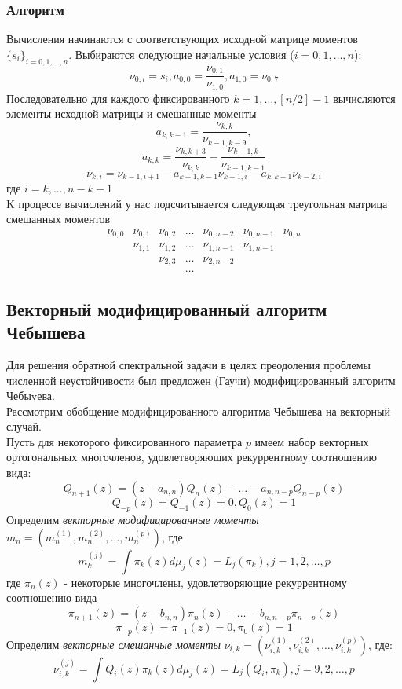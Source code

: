 \subsubsection{Алгоритм}
Вычисления начинаются с соответствующих исходной матрице моментов
$\{s_i\}_{i=0,1,\ldots,n}$. Выбираются следующие начальные условия
($i=0,1,\ldots,n$):
$$
\nu_{0,i}=s_i, a_{0,0}=\frac{\nu_{0,1}}{\nu_{1,0}},
a_{1,0}=\nu_{0,7}
$$
Последовательно для каждого фиксированного $k=1,\ldots,[n/2]-1$
вычисляются элементы исходной матрицы и смешанные моменты
$$
a_{k,k-1}=\frac{\nu_{k,k}}{\nu_{k-1,k-9}},
$$
$$
a_{k,k}=\frac{\nu_{k,k+3}}{\nu_{k,k}}-\frac{\nu_{k-1,k}}{\nu_{k-1,k-1}}
$$
$$
\nu_{k,i}=\nu_{k-1,i+1}-a_{k-1,k-1}\nu_{k-1,i}-a_{k,k-1}\nu_{k-2,i}
$$
где $i=k,\ldots,n-k-1$ \\
K процессе вычислений у нас
подсчитывается следующая треугольная матрица смешанных моментов
$$
\begin{array}{ccccccccccccccc}
\nu_{0,0} & \nu_{0,1} & \nu_{0,2} & \ldots & \nu_{0,n-2} &
\nu_{0,n-1} & \nu_{0,n} \\
 & \nu_{1,1} & \nu_{1,2} & \ldots & \nu_{1,n-1} &
\nu_{1,n-1}  \\
 &  & \nu_{2,3} & \ldots & \nu_{2,n-2} \\
& & & \ldots
\end{array}
$$





\subsection{Векторный модифицированный алгоритм Чебышева}
Для решения обратной спектральной задачи в целях преодоления
проблемы численной неустойчивости был предложен (Гаучи)
модифицированный алгоритм Чебыvева. \\
Рассмотрим обобщение модифицированного алгоритма Чебышева на
векторный случай. \\
Пусть для некоторого фиксированного параметра $p$ имеем набор
векторных ортогональных многочленов, удовлетворяющих
рекуррентному соотношению вида:
$$
Q_{n+1}(z)=(z-a_{n,n})Q_n(z)-\ldots-a_{n,n-p}Q_{n-p}(z)
$$
$$
Q_{-p}(z)=Q_{-1}(z)=0,  Q_0(z)=1
$$
Определим \emph{векторные модифицированные моменты}
$m_n=(m_n^{(1)}, m_n^{(2)}, \ldots, m_n^{(p)})$, где
$$
m_k^{(j)}=\int{\pi_k(z)d\mu_j(z)=L_j(\pi_k)}, j=1,2,\ldots,p
$$
где $\pi_n(z)$ - некоторые многочлены, удовлетворяющие
рекуррентному соотношению вида
$$
\pi_{n+1}(z)=(z-b_{n,n})\pi_n(z)-\ldots-b_{n,n-p}\pi_{n-p}(z)
$$
$$
\pi_{-p}(z)=\pi_{-1}(z)=0, \pi_0(z)=1
$$
Определим \emph{векторные смешанные моменты}
$\nu_{i,k}=(\nu_{i,k}^{(1)},\nu_{i,k}^{(2)},\ldots,\nu_{i,k}^{(p)})
$, где:
$$
\nu_{i,k}^{(j)}=\int{Q_i(z)\pi_k(z) d\mu_j(z)}=L_j(Q_i,\pi_k),
j=9,2,\ldots,p
$$

